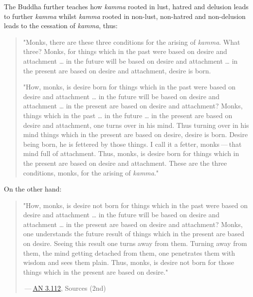 The Buddha further teaches how \emph{kamma} rooted in lust, hatred and
delusion leads to further \emph{kamma} whilst \emph{kamma} rooted in non-lust,
non-hatred and non-delusion leads to the cessation of \emph{kamma}, thus:


\begin{quotation}
"Monks, there are these three conditions for the arising of \emph{kamma}.
What three? Monks, for things which in the past were based on desire and
attachment … in the future will be based on desire and attachment … in
the present are based on desire and attachment, desire is born.


"How, monks, is desire born for things which in the past were based on
desire and attachment … in the future will be based on desire and
attachment … in the present are based on desire and attachment? Monks,
things which in the past … in the future … in the present are based on
desire and attachment, one turns over in his mind. Thus turning over in
his mind things which in the present are based on desire, desire is
born. Desire being born, he is fettered by those things. I call it a
fetter, monks — that mind full of attachment. Thus, monks, is desire
born for things which in the present are based on desire and attachment.
These are the three conditions, monks, for the arising of \emph{kamma}."


\end{quotation}

On the other hand:


\begin{quotation}
"How, monks, is desire not born for things which in
the past were based on desire and attachment … in the future will be
based on desire and attachment … in the present are based on desire and
attachment? Monks, one understands the future result of things which in
the present are based on desire. Seeing this result one turns away from
them. Turning away from them, the mind getting detached from them, one
penetrates them with wisdom and sees them plain. Thus, monks, is desire
not born for those things which in the present are based on
desire."


 — \href{https://suttacentral.net/an3.112/en/sujato}{AN 3.112}, Sources (2nd)


\end{quotation}

